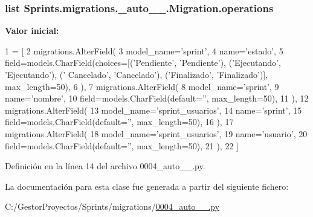 \subsubsection[{\texorpdfstring{operations}{operations}}]{\setlength{\rightskip}{0pt plus 5cm}list Sprints.\+migrations.\+\_\+auto\+\_\+\_.\+Migration.\+operations\hspace{0.3cm}{\ttfamily [static]}}\hypertarget{class_sprints_1_1migrations_1_10004__auto__20160630__1356_1_1_migration_acf10e0f603c056b3cc1e7762e78cf02c}{}\label{class_sprints_1_1migrations_1_10004__auto__20160630__1356_1_1_migration_acf10e0f603c056b3cc1e7762e78cf02c}
{\bfseries Valor inicial\+:}
\begin{DoxyCode}
1 = [
2         migrations.AlterField(
3             model\_name=\textcolor{stringliteral}{'sprint'},
4             name=\textcolor{stringliteral}{'estado'},
5             field=models.CharField(choices=[(\textcolor{stringliteral}{'Pendiente'}, \textcolor{stringliteral}{'Pendiente'}), (\textcolor{stringliteral}{'Ejecutando'}, \textcolor{stringliteral}{'Ejecutando'}), (\textcolor{stringliteral}{'
      Cancelado'}, \textcolor{stringliteral}{'Cancelado'}), (\textcolor{stringliteral}{'Finalizado'}, \textcolor{stringliteral}{'Finalizado'})], max\_length=50),
6         ),
7         migrations.AlterField(
8             model\_name=\textcolor{stringliteral}{'sprint'},
9             name=\textcolor{stringliteral}{'nombre'},
10             field=models.CharField(default=\textcolor{stringliteral}{''}, max\_length=50),
11         ),
12         migrations.AlterField(
13             model\_name=\textcolor{stringliteral}{'sprint\_usuarios'},
14             name=\textcolor{stringliteral}{'sprint'},
15             field=models.CharField(default=\textcolor{stringliteral}{''}, max\_length=50),
16         ),
17         migrations.AlterField(
18             model\_name=\textcolor{stringliteral}{'sprint\_usuarios'},
19             name=\textcolor{stringliteral}{'usuario'},
20             field=models.CharField(default=\textcolor{stringliteral}{''}, max\_length=50),
21         ),
22     ]
\end{DoxyCode}


Definición en la línea 14 del archivo 0004\+\_\+auto\+\_\+\_.\+py.



La documentación para esta clase fue generada a partir del siguiente fichero\+:\begin{DoxyCompactItemize}
\item 
C\+:/\+Gestor\+Proyectos/\+Sprints/migrations/\hyperlink{0004__auto__20160630__1356_8py}{0004\+\_\+auto\+\_\+\_.\+py}\end{DoxyCompactItemize}
